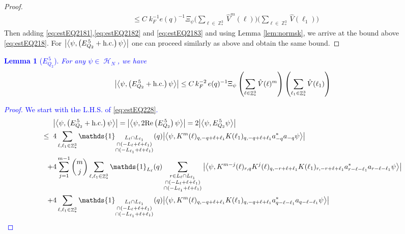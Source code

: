 \documentclass[sn-mathphys, Numbered ,a4paper]{sn-jnl}%
\DeclareMathOperator{\Z}{\mathbb{Z}}
\DeclareMathOperator{\HH}{\mathcal{H}}
\newcommand{\eva}[1]{\left\langle #1 \right\rangle}
\theoremstyle{plain}
\newtheorem{lemma}[theorem]{Lemma}
\theoremstyle{definition}
\theoremstyle{remark}
\theoremstyle{plain}
\theoremstyle{definition}
\theoremstyle{remark}
\begin{document}
\begin{proof}
\begin{align}
		&\leq C\; k_F^{-1}e(q)^{-1} \Xi_{\psi} \Bigg(\sum\limits_{\ell \in \Z^3_*} \hat{V}^{m}(\ell) \Bigg)\Bigg(\sum\limits_{\ell \in \Z^3_*} \hat{V}(\ell_1)\Bigg)  \label{eq:estEQ2183}
	\end{align} 
	Then adding \eqref{eq:estEQ2181},\eqref{eq:estEQ2182} and \eqref{eq:estEQ2183} and using Lemma \ref{lem:normsk}, we arrive at the bound above \eqref{eq:estEQ218}. For $\abs{\eva{\psi,\left(E^{\,5}_{Q_2}+\mathrm{h.c.}\right) \psi }}$ one can proceed similarly as above and obtain the same bound.
\end{proof}

\textcolor{blue}{\begin{lemma}[$E_{Q_2}^{\,5}$]\label{lem:EQ228}
		For any $\psi \in \HH_N$, we have
		\begin{align}
			\abs{\eva{\psi,\left(E^{\,5}_{Q_2}+\mathrm{h.c.}\right) \psi }}
			\leq  C\, k_{F}^{-2}\, e(q)^{-1} \Xi_{\psi} \left(\sum\limits_{\ell \in \Z^3_*} \hat{V}(\ell)^m \right) \left(\sum\limits_{\ell_1 \in \Z^3_*} \hat{V}(\ell_1) \right) \label{eq:estEQ228}
		\end{align}
	\end{lemma}
	\begin{proof}
		We start with the L.H.S. of \eqref{eq:estEQ228}.
		\begin{align}
			&\abs{\eva{\psi,\left(E^{\,5}_{Q_2}+\mathrm{h.c.}\right) \psi }} = \abs{\eva{\psi,2\mathrm{Re}\left(E^{\,5}_{Q_2}\right) \psi }} = 2\abs{\eva{\psi, E^{\,5}_{Q_2} \psi }}\nonumber\\
			\leq\;\;&4 \sum\limits_{\ell, \ell_1\in \Z^3_*} \mathds{1}_{\substack{L_{\ell}\cap L_{\ell_1}\\\cap (-L_{\ell}+\ell+\ell_1) \\ \cap (-L_{\ell_1}+\ell+\ell_1)}}(q) \abs{\eva{\psi, K^m(\ell)_{q,-q+\ell+\ell_1}K(\ell_1)_{q,-q+\ell+\ell_1} a^*_{-q}a_{-q} \psi}} \label{eq:EQ2281}\\
			\;+&4 \sum\limits_{j=1}^{m-1} {{m}\choose j} \sum\limits_{\ell, \ell_1\in \Z^3_*}\mathds{1}_{L_{\ell}}(q) \sum\limits_{\substack{r\in L_{\ell} \cap L_{\ell_1}\\\cap (-L_{\ell}+\ell+\ell_1) \\ \cap (-L_{\ell_1}+\ell+\ell_1)}}  \abs{\eva{\psi, K^{m-j}(\ell)_{r,q} K^j(\ell)_{q,-r+\ell+\ell_1} K(\ell_1)_{r,-r+\ell+\ell_1} a^*_{r-\ell-\ell_1}a_{r-\ell-\ell_1} \psi }} \label{eq:EQ2282}\\
			\;+&4\sum\limits_{\ell, \ell_1\in \Z^3_*} \mathds{1}_{\substack{L_{\ell}\cap L_{\ell_1}\\\cap (-L_{\ell}+\ell+\ell_1) \\ \cap (-L_{\ell_1}+\ell+\ell_1)}}(q)  \abs{\eva{\psi, K^m(\ell)_{q,-q+\ell+\ell_1} K(\ell_1)_{q,-q+\ell+\ell_1} a^*_{q-\ell-\ell_1}a_{q-\ell-\ell_1} \psi}} \label{eq:EQ2283}

\end{align}
\end{proof}}
\end{document}
